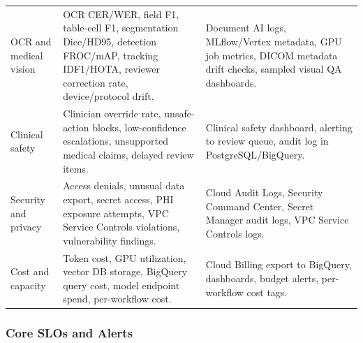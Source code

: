 \begin{longtable}{p{}p{}p{}}
OCR and medical vision & OCR CER/WER, field F1, table-cell F1, segmentation Dice/HD95, detection FROC/mAP, tracking IDF1/HOTA, reviewer correction rate, device/protocol drift. & Document AI logs, MLflow/Vertex metadata, GPU job metrics, DICOM metadata drift checks, sampled visual QA dashboards. \\
\addlinespace
Clinical safety & Clinician override rate, unsafe-action blocks, low-confidence escalations, unsupported medical claims, delayed review items. & Clinical safety dashboard, alerting to review queue, audit log in PostgreSQL/BigQuery. \\
\addlinespace
Security and privacy & Access denials, unusual data export, secret access, PHI exposure attempts, VPC Service Controls violations, vulnerability findings. & Cloud Audit Logs, Security Command Center, Secret Manager audit logs, VPC Service Controls logs. \\
\addlinespace
Cost and capacity & Token cost, GPU utilization, vector DB storage, BigQuery query cost, model endpoint spend, per-workflow cost. & Cloud Billing export to BigQuery, dashboards, budget alerts, per-workflow cost tags. \\
\bottomrule
\end{longtable}

\subsubsection{Core SLOs and Alerts}

